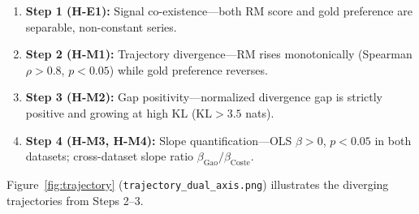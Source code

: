\begin{enumerate}
\item \textbf{Step 1 (H-E1):} Signal co-existence---both RM score and gold preference are separable, non-constant series.
\item \textbf{Step 2 (H-M1):} Trajectory divergence---RM rises monotonically (Spearman $\rho > 0.8$, $p < 0.05$) while gold preference reverses.
\item \textbf{Step 3 (H-M2):} Gap positivity---normalized divergence gap is strictly positive and growing at high KL ($\text{KL} > 3.5$ nats).
\item \textbf{Step 4 (H-M3, H-M4):} Slope quantification---OLS $\beta > 0$, $p < 0.05$ in both datasets; cross-dataset slope ratio $\beta_\text{Gao} / \beta_\text{Coste}$.
\end{enumerate}

Figure~\ref{fig:trajectory} (\texttt{trajectory\_dual\_axis.png}) illustrates the diverging trajectories from Steps 2--3.
